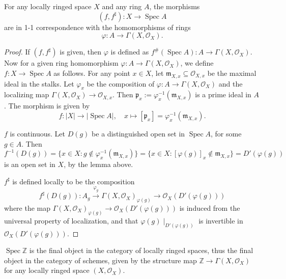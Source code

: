 \documentclass[11pt]{article}
\newcommand{\Spec}{\operatorname{Spec}}
\begin{document}
\begin{theorem}
    \label{thm: locally ringed space to affine scheme}
    \cite[Theorem I-40]{EisenbudHarris} 
    For any locally ringed space $ X $ and any ring $ A $, the morphisms 
    $$ (f,f^{\sharp}) : X \to \Spec A $$
    are in 1-1 correspondence with the homomorphisms of rings 
    $$ \varphi: A \to \Gamma(X,\mathscr{O}_{X}). $$
\end{theorem}

\begin{proof}
    If $ (f,f^{\sharp}) $ is given, then $ \varphi $ is defined as 
    $ f^{\#}(\Spec A): A \to \Gamma(X,\mathscr{O}_{X}) $. Now for a given ring homomorphism 
    $ \varphi : A \to \Gamma(X,\mathscr{O}_{X}) $, we define $ f : X \to \Spec A $ as follows. 
    For any point $ x \in X $, let $ \mathfrak{m}_{X,x} \subseteq \mathscr{O}_{X,x} $ be the maximal 
    ideal in the stalks. Let $ \varphi_{x} $ be the composition of $ \varphi : A \to \Gamma(X,\mathscr{O}_{X})$ 
    and the localizing map $ \Gamma(X,\mathscr{O}_{X}) \to \mathscr{O}_{X,x} $. 
    Then $ \mathfrak{p}_{x}:= \varphi^{-1}_{x}(\mathfrak{m}_{X,x}) $ is a prime ideal in $ A $. 
    The morphism is given by 
    $$ f: |X| \to |\Spec A|, \quad x \mapsto [\mathfrak{p}_{x}]= \varphi^{-1}_{x}(\mathfrak{m}_{X,x}).$$

    $ f $ is continuous. Let $ D(g) $ be a distinguished open set in $ \Spec A $, for some $ g \in A $. 
    Then 
    $$ f^{-1}(D(g)) = \{x \in X: g \notin \varphi^{-1}_{x}(\mathfrak{m}_{X,x})\} 
    =  \{x \in X: [\varphi(g)]_{x} \notin \mathfrak{m}_{X,x}\} = D'(\varphi(g))$$ 
    is an open set in $ X $, by the lemma above. 
    
    $ f^{\sharp} $ is defined locally to be the composition 
    $$ f^{\sharp} (D(g)) :  A_{g} \xrightarrow{\varphi_{g}} \Gamma(X,\mathscr{O}_{X})_{\varphi(g)} \to  \mathscr{O}_{X}(D'(\varphi(g)))  $$
    where the map $ \Gamma(X,\mathscr{O}_{X})_{\varphi(g)} \to  \mathscr{O}_{X}(D'(\varphi(g))) $ 
    is induced from the universal property of localization, and that $ \varphi(g)\mid_{D'(\varphi(g))} $ 
    is invertible in $ \mathscr{O}_{X}(D'(\varphi(g)))$. 
\end{proof}

\begin{corollary}
    \cite[Exercise II.2.5]{hartsAG} 
    $ \Spec \mathbb{Z} $ is the final object in the category of locally ringed spaces, 
    thus the final object in the category of schemes, 
    given by the structure map $ \mathbb{Z} \to \Gamma(X,\mathscr{O}_{X}) $ for any 
    locally ringed space $ (X,\mathscr{O}_{X}) $. 
\end{corollary}
\end{document}
